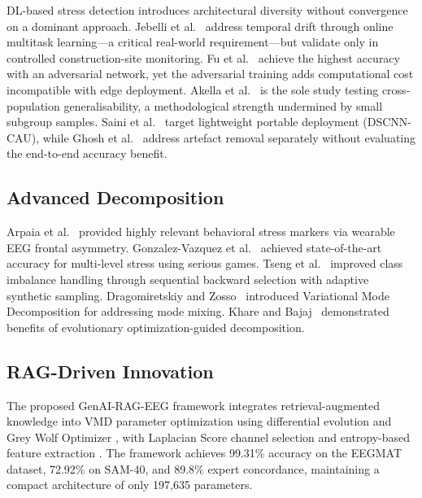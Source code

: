 DL-based stress detection introduces architectural diversity without convergence on a dominant approach. Jebelli et al.~\cite{jebelli2018eeg} address temporal drift through online multitask learning---a critical real-world requirement---but validate only in controlled construction-site monitoring. Fu et al.~\cite{fu2022symmetric} achieve the highest accuracy with an adversarial network, yet the adversarial training adds computational cost incompatible with edge deployment. Akella et al.~\cite{akella2021autoencoder} is the sole study testing cross-population generalisability, a methodological strength undermined by small subgroup samples. Saini et al.~\cite{saini2022dscnn} target lightweight portable deployment (DSCNN-CAU), while Ghosh et al.~\cite{ghosh2023artifact} address artefact removal separately without evaluating the end-to-end accuracy benefit.

\subsection{Advanced Decomposition}

Arpaia et al.~\cite{arpaia2020wearable} provided highly relevant behavioral stress markers via wearable EEG frontal asymmetry. Gonzalez-Vazquez et al.~\cite{gonzalezvazquez2024dl} achieved state-of-the-art accuracy for multi-level stress using serious games. Tseng et al.~\cite{tseng2024sbs} improved class imbalance handling through sequential backward selection with adaptive synthetic sampling. Dragomiretskiy and Zosso~\cite{dragomiretskiy2013vmd} introduced Variational Mode Decomposition for addressing mode mixing. Khare and Bajaj~\cite{khare2020evolutionary} demonstrated benefits of evolutionary optimization-guided decomposition.

\subsection{RAG-Driven Innovation}

The proposed GenAI-RAG-EEG framework integrates retrieval-augmented knowledge into VMD parameter optimization using differential evolution \cite{storn1997de} and Grey Wolf Optimizer \cite{mirjalili2014gwo}, with Laplacian Score channel selection \cite{he2005laplacian} and entropy-based feature extraction \cite{sabeti2009entropy}. The framework achieves 99.31\% accuracy on the EEGMAT dataset, 72.92\% on SAM-40, and 89.8\% expert concordance, maintaining a compact architecture of only 197,635 parameters.

